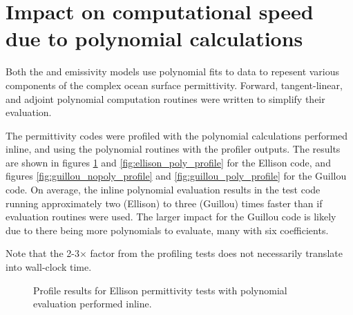 \section{Impact on computational speed due to polynomial calculations}
\label{sec:Poly_Routine_Speed.appendix}
Both the \citet{Ellison_2003} and \citet{Guillou_1998} emissivity models use polynomial fits to data to repesent various components of the complex ocean surface permittivity. Forward, tangent-linear, and adjoint polynomial computation routines were written to simplify their evaluation.

The permittivity codes were profiled with the polynomial calculations performed inline, and using the polynomial routines with the profiler outputs. The results are shown in figures \ref{fig:ellison_nopoly_profile} and \ref{fig:ellison_poly_profile} for the Ellison code, and figures \ref{fig:guillou_nopoly_profile} and \ref{fig:guillou_poly_profile} for the Guillou code. On average, the inline polynomial evaluation results in the test code running approximately two (Ellison) to three (Guillou) times faster than if evaluation routines were used. The larger impact for the Guillou code is likely due to there being more polynomials to evaluate, many with six coefficients.

Note that the 2-3$\times$ factor from the profiling tests does not necessarily translate into wall-clock time.

\begin{figure}[htp]
  \centering
  \caption{Profile results for Ellison permittivity tests with polynomial evaluation performed inline.}
  \label{fig:ellison_nopoly_profile}
\end{figure}

